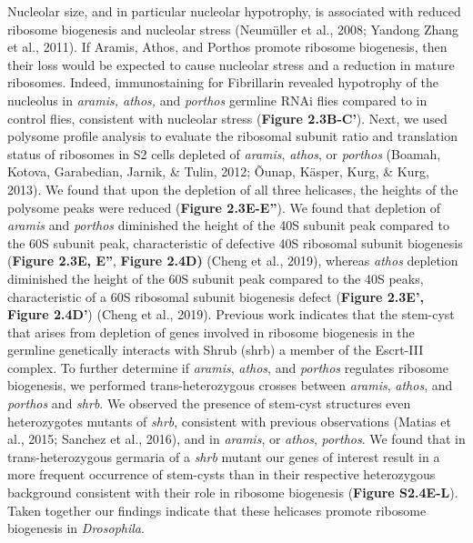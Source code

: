 \documentclass[12pt,oneside]{reedthesis}
\begin{document}
Nucleolar size, and in particular nucleolar hypotrophy, is associated with reduced ribosome biogenesis and nucleolar stress (Neumüller et al., 2008; Yandong Zhang et al., 2011). If Aramis, Athos, and Porthos promote ribosome biogenesis, then their loss would be expected to cause nucleolar stress and a reduction in mature ribosomes. Indeed, immunostaining for Fibrillarin revealed hypotrophy of the nucleolus in \emph{aramis, athos,} and \emph{porthos} germline RNAi flies compared to in control flies, consistent with nucleolar stress (\textbf{Figure 2.3B-C'}). Next, we used polysome profile analysis to evaluate the ribosomal subunit ratio and translation status of ribosomes in S2 cells depleted of \emph{aramis}, \emph{athos}, or \emph{porthos} (Boamah, Kotova, Garabedian, Jarnik, \& Tulin, 2012; Õunap, Käsper, Kurg, \& Kurg, 2013). We found that upon the depletion of all three helicases, the heights of the polysome peaks were reduced (\textbf{Figure 2.3E-E''}). We found that depletion of \emph{aramis} and \emph{porthos} diminished the height of the 40S subunit peak compared to the 60S subunit peak, characteristic of defective 40S ribosomal subunit biogenesis (\textbf{Figure 2.3E, E''}, \textbf{Figure 2.4D)} (Cheng et al., 2019), whereas \emph{athos} depletion diminished the height of the 60S subunit peak compared to the 40S peaks, characteristic of a 60S ribosomal subunit biogenesis defect (\textbf{Figure 2.3E', Figure 2.4D'}) (Cheng et al., 2019). Previous work indicates that the stem-cyst that arises from depletion of genes involved in ribosome biogenesis in the germline genetically interacts with Shrub (shrb) a member of the Escrt-III complex. To further determine if \emph{aramis}, \emph{athos}, and \emph{porthos} regulates ribosome biogenesis, we performed trans-heterozygous crosses between \emph{aramis}, \emph{athos}, and \emph{porthos} and \emph{shrb}. We observed the presence of stem-cyst structures even heterozygotes mutants of \emph{shrb}, consistent with previous observations (Matias et al., 2015; Sanchez et al., 2016), and in \emph{aramis}, or \emph{athos}, \emph{porthos}. We found that in trans-heterozygous germaria of a \emph{shrb} mutant our genes of interest result in a more frequent occurrence of stem-cysts than in their respective heterozygous background consistent with their role in ribosome biogenesis (\textbf{Figure S2.4E-L}). Taken together our findings indicate that these helicases promote ribosome biogenesis in \emph{Drosophila}.
\end{document}
